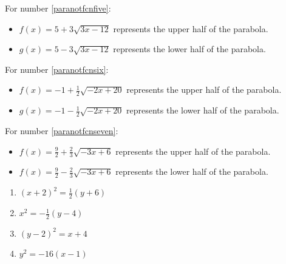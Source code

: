 \begin{enumerate}
\begin{itemize}
\end{itemize}


For number \ref{paranotfcnfive}:

\begin{itemize}

\item   $f(x) =5+3 \sqrt{3x-12}$ represents the upper half of the parabola.

\item  $g(x) =5- 3 \sqrt{3x-12}$ represents the lower half of the parabola.

\end{itemize}


For number \ref{paranotfcnsix}:

\begin{itemize}

\item   $f(x) =-1 + \frac{1}{2} \sqrt{-2x+20}$ represents the upper half of the parabola.

\item  $g(x) =-1 - \frac{1}{2} \sqrt{-2x+20}$ represents the lower half of the parabola.

\end{itemize}

For number \ref{paranotfcnseven}:

\begin{itemize}

\item   $f(x) = \frac{9}{2} + \frac{2}{3} \sqrt{-3x+6}$ represents the upper half of the parabola.

\item  $f(x) = \frac{9}{2} - \frac{2}{3} \sqrt{-3x+6}$ represents the lower half of the parabola.

\end{itemize}


\setcounter{HW}{\value{enumi}}
\end{enumerate}

\begin{multicols}{4}
\begin{enumerate}
\setcounter{enumi}{\value{HW}}

\item  $(x+2)^2 = \frac{1}{2} (y+6)$
\item  $x^2 = -\frac{1}{2}(y-4)$
\item $(y-2)^2=x+4$  
\item $y^2 = -16(x-1)$  


\setcounter{HW}{\value{enumi}}
\end{enumerate}
\end{multicols}


